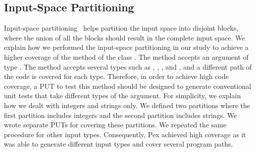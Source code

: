 \subsection{Input-Space Partitioning}
\label{sec:inputspace}

Input-space partitioning~\cite{paul:offut} helps partition the input space into disjoint blocks,
where the union of all the blocks should result in the complete input space.  
We explain how we performed the input-space partitioning in our study to achieve
a higher coverage of the method  of the class
. The  method accepts an argument of type
. The method accepts several types such as , ,
, and , and a different path of the code is covered for each type. Therefore, in order to achieve high code coverage, a PUT to test this method should be designed to generate conventional unit tests that take different types of the argument. For simplicity, we explain how we dealt with
integers and strings only. We defined two partitions where the first partition includes
integers and the second partition includes strings. We wrote separate PUTs for
covering these partitions. We repeated the same procedure for other input types. Consequently, Pex achieved high coverage as it was able to generate different input types and cover several program paths.
%
